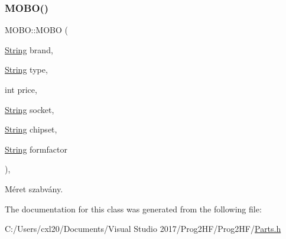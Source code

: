 \subsubsection{\texorpdfstring{MOBO()}{MOBO()}}
{\footnotesize\ttfamily M\+O\+B\+O\+::\+M\+O\+BO (\begin{DoxyParamCaption}\item[{\mbox{\hyperlink{class_string}{String}}}]{brand,  }\item[{\mbox{\hyperlink{class_string}{String}}}]{type,  }\item[{int}]{price,  }\item[{\mbox{\hyperlink{class_string}{String}}}]{socket,  }\item[{\mbox{\hyperlink{class_string}{String}}}]{chipset,  }\item[{\mbox{\hyperlink{class_string}{String}}}]{formfactor }\end{DoxyParamCaption})\hspace{0.3cm}{\ttfamily [inline]}, {\ttfamily [explicit]}}



Méret szabvány. 



The documentation for this class was generated from the following file\+:\begin{DoxyCompactItemize}
\item 
C\+:/\+Users/cxl20/\+Documents/\+Visual Studio 2017/\+Prog2\+H\+F/\+Prog2\+H\+F/\mbox{\hyperlink{_parts_8h}{Parts.\+h}}\end{DoxyCompactItemize}
